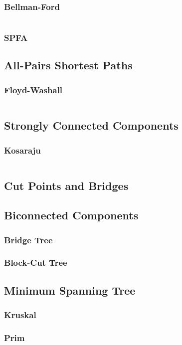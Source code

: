 \documentclass[8pt,a4paper,landscape,oneside]{amsart}
\newcommand{\code}[1]{\inputminted[fontsize=\normalsize,baselinestretch=1]{cpp}{_code/#1}}
\begin{document}
\begin{multicols*}{3}
		\subsubsection{Bellman-Ford}
			\code{graphs/bellman_ford.cpp}
    \subsubsection{SPFA}
	\subsection{All-Pairs Shortest Paths}
		\subsubsection{Floyd-Washall}
			\code{graphs/floyd_warshall.cpp}
	\subsection{Strongly Connected Components}
		\subsubsection{Kosaraju}
      \code{graphs/Kosaraju.cpp}
	\subsection{Cut Points and Bridges}
	\subsection{Biconnected Components}
		\subsubsection{Bridge Tree}
		\subsubsection{Block-Cut Tree}
	\subsection{Minimum Spanning Tree}
		\subsubsection{Kruskal}
		\subsubsection{Prim}

\end{multicols*}
\end{document}
